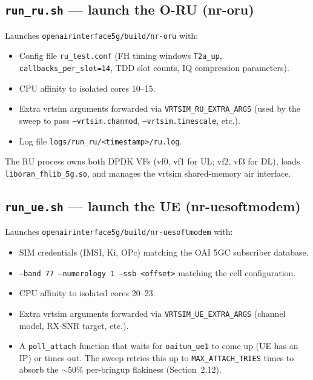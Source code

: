 \documentclass[11pt,a4paper]{article}
\begin{document}
\subsection{\texttt{run\_ru.sh} --- launch the O-RU (nr-oru)}

Launches \texttt{openairinterface5g/build/nr-oru} with:
\begin{itemize}[leftmargin=1.4em]
\item Config file \texttt{ru\_test.conf} (FH timing windows \texttt{T2a\_up},
  \texttt{callbacks\_per\_slot=14}, TDD slot counts, IQ compression parameters).
\item CPU affinity to isolated cores 10--15.
\item Extra vrtsim arguments forwarded via \texttt{VRTSIM\_RU\_EXTRA\_ARGS} (used by the
  sweep to pass \texttt{--vrtsim.chanmod}, \texttt{--vrtsim.timescale}, etc.).
\item Log file \texttt{logs/run\_ru/<timestamp>/ru.log}.
\end{itemize}
The RU process owns both DPDK VFs (vf0, vf1 for UL; vf2, vf3 for DL), loads
\texttt{liboran\_fhlib\_5g.so}, and manages the vrtsim shared-memory air interface.

\subsection{\texttt{run\_ue.sh} --- launch the UE (nr-uesoftmodem)}

Launches \texttt{openairinterface5g/build/nr-uesoftmodem} with:
\begin{itemize}[leftmargin=1.4em]
\item SIM credentials (IMSI, Ki, OPc) matching the OAI 5GC subscriber database.
\item \texttt{--band 77 --numerology 1 --ssb <offset>} matching the cell configuration.
\item CPU affinity to isolated cores 20--23.
\item Extra vrtsim arguments forwarded via \texttt{VRTSIM\_UE\_EXTRA\_ARGS} (channel model,
  RX-SNR target, etc.).
\item A \texttt{poll\_attach} function that waits for \texttt{oaitun\_ue1} to come up (UE
  has an IP) or times out. The sweep retries this up to \texttt{MAX\_ATTACH\_TRIES} times to
  absorb the $\sim$50\% per-bringup flakiness (Section~2.12).
\end{itemize}
\end{document}
